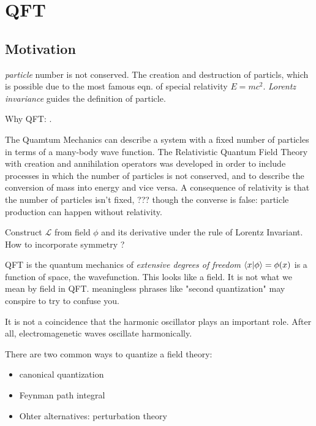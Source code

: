 \newcommand{\QM}{Quamtum Mechanics}
\newcommand{\QFT}{Quantum Field Theory}
\newcommand{\RQFT}{Relativistic Quantum Field Theory}
\newcommand{\FT}{Fourier Transform}
\newcommand{\FFT}{Fast Fourier Transform}
\newcommand{\LT}{Lorentz Transform}
\newcommand{\LI}{Lorentz Invariant}
\newcommand{\LG}{Lorentz Group}
\newcommand{\KG}{Klein-Gordon}
\newcommand{\EL}{Euler-Lagrange}
\newcommand{\sr}{special relativity}

\chapter{QFT}

\section{Motivation}

\emph{particle} number is not conserved. The creation and destruction of
particls, which is possible due to the most famous eqn. of \sr{} $E =
mc^{2}$. \emph{Lorentz invariance} guides the definition of particle.

Why QFT: . \\

The \QM{} can describe a system with a fixed number of particles
in terms of a many-body wave function. The \RQFT{}
with creation and annihilation operators was developed in order to include
processes in which the number of particles is not conserved,
and to describe the conversion of mass into energy and vice versa.
A consequence of relativity is that the number of particles isn't fixed, ???
though the converse is false: particle production can happen without relativity.

Construct $\mathcal{L}$ from field $\phi$ and its derivative under the rule
of \LI{}. How to incorporate symmetry ?

QFT is the quantum mechanics of {\Large \textit{extensive degrees of freedom}}
$\bra{x}\ket{\phi} = \phi(x)$ is a function of space, the wavefunction.
This looks like a field. It is not what we mean by field in QFT.
meaningless phrases like "second quantization" may conspire to try
to confuse you.

It is not a coincidence that the harmonic oscillator plays an important
role. After all, electromagenetic waves oscillate harmonically.

There are two common ways to quantize a field theory:
\begin{itemize}
    \item canonical quantization
    \item Feynman path integral
    \item Ohter alternatives: perturbation theory
\end{itemize}
